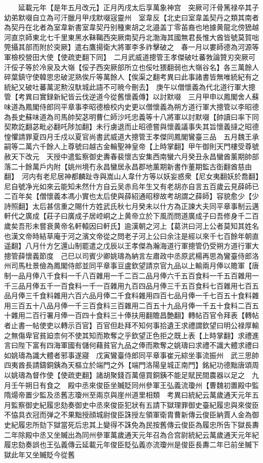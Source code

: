 　　延載元年【是年五月改元】正月丙戌太后享萬象神宫　突厥可汗骨篤禄卒其子幼弟默啜自立為可汗臘月甲戌默啜宼靈州　室韋反【北史曰室韋盖契丹之類其南者為契丹在北者為室韋新書室韋契丹别種東胡之北邉盖丁零苖裔也地據黄龍北傍峱越河直京師東北七千里東黑水靺鞨西突厥南契丹北渤海其國無君長惟大酋皆號莫賀咄筦攝其部而附於突厥】遣右鷹揚衛大將軍李多祚擊破之　春一月以婁師德為河源等軍檢校營田大使【使疏吏翻下同】　二月武威道摠管王孝傑破吐蕃㪍論贊刃突厥可汗俀子等於冷泉及大嶺【俀子西突厥部所立也俀吐猥翻弱也大嶺谷名】各三萬餘人碎葉鎮守使韓思忠破泥熟俟斤等萬餘人【俟渠之翻考異曰此事諸書皆無唯統紀有之統紀又破吐蕃萬泥勲沒馱城此語不可暁今刪去】　庚午以僧懷義為代北道行軍大摠管【考異曰實録新紀皆云伐逆道今從舊懷義傳】以討默啜　三月甲申以鳳閣舍人蘇味道為鳳閣侍郎同平章事李昭德檢校内史更以僧懷義為朔方道行軍大摠管以李昭德為長史蘇味道為司馬帥契苾明曹仁師沙吒忠義等十八將軍以討默啜【帥讀曰率下同契欺訖翻苾毗必翻吒陟加翻】未行虜退而止昭德嘗與懷義議事失其旨懷義撻之昭德惶懼請罪夏四月壬戍以夏官尚書武威道大摠管王孝傑同鳳閣鸞臺三品　五月魏王承嗣等二萬六千餘人上尊號曰越古金輪聖神皇帝【上時掌翻】甲午御則天門樓受尊號赦天下改元　天授中遣監察御史夀春裴懷古安集西南蠻六月癸丑永昌蠻酋薰期帥部落二十餘萬戶内附【姚州境冇永昌蠻居永昌郡地薰期新書作董期監古衘翻酋慈由翻】　河内有老尼居神都麟趾寺與嵩山人韋什方等以妖妄惑衆【尼女夷翻妖於喬翻】尼自號净光如來云能知未然什方自云吴赤烏年生又有老胡亦自言五百歲云見薛師已二百年矣【僧懷義本馮小實也太后使與薛紹通昭穆故考胡謂之薛師】容貌愈少【少詩照翻】太后甚信重之賜什方姓武氏秋七月癸未以什方為正諫大夫同平章事制云邁軒代之廣成【莊子曰廣成子居崆峒之上黄帝立於下風而問道廣成子曰吾修身千二百歲矣吾形未嘗衰黄帝名軒轅因曰軒氏】逾漢朝之河上【葛洪曰河上公者莫知其姓名也漢文帝時結草庵于河之濱文帝從之問老子河上公曰余注是經以來千七百餘年朝直遥翻】八月什方乞還山制罷遣之戊辰以王孝傑為瀚海道行軍摠管仍受朔方道行軍大摠管薛懷義節度　己巳以司賓少卿姚璹為納言左肅政中丞原武楊再思為鸞臺侍郎洛州司馬杜景儉為鳳閣侍郎並同平章事豆盧欽望請京官九品以上輸兩月俸以贍軍【唐制一品月俸八千食料一千八百雜用一千二百二品月俸六千五百食料一千五百雜用一千三品月俸五千一百食料一千一百雜用九百四品月俸三千五百食料七百雜用七百五品月俸三千食料雜用六百六品月俸二千食料雜用四百七品月俸一千七百五十食料雜用三百五十八品月俸一千三百食料三百雜用二百五十九品月俸一千五十食料二百五十雜用二百行署月俸一百四十食料三十俸扶用翻贍昌艶翻】轉帖百官令拜表【轉帖者止書一帖使吏以轉示百官】百官但赴拜不知何事拾遺王求禮謂欽望曰明公禄厚輸之無傷卑官貧廹柰何不使其知而欺奪之乎欽望正色拒之既上表【上時掌翻】求禮進言曰陛下富有四海軍國有儲何藉貧官九品之俸而欺奪之姚璹曰求禮不識大體求禮曰如姚璹為識大體者邪事遂寢　戊寅鸞臺侍郎同平章事崔元綜坐事流振州　武三思帥四夷酋長請鑄銅銕為天樞立於端門之外【端門洛陽皇城正南門】銘紀功德黜唐頌周以姚璹為督作使【使疏吏翻】諸胡聚錢百萬億買銅銕不能足賦民間農器以足之　九月壬午朔日有食之　殿中丞來俊臣坐贓貶同州參軍王弘義流瓊州【曹魏初置殿中監隋煬帝置少監及丞舊志瓊州至兩京與崖州道里相類　考異曰統紀云萬歲通天元年五月監察御史紀履忠劾奏御史中丞來俊臣犯狀有五請下獄理罪御史臺紀履忠與來俊臣不恊具衣冠而弹之不果黜授顔城尉俊臣誅授左領軍衛胄曹新傳云俊臣納賈人金為御史紀履忠所劾下獄當死后忠其上變得不誅免為民按舊傳云俊臣為履忠所告下獄長夀二年除殿中丞又坐贓出為同州參軍萬歲通天元年召為合宫尉統紀云萬歲通天元年紀履忠劾奏誤也王弘義傳云延載元年俊臣貶弘義亦流瓊州是俊臣長夀二年已前坐贓下獄此年又坐贓貶今從舊